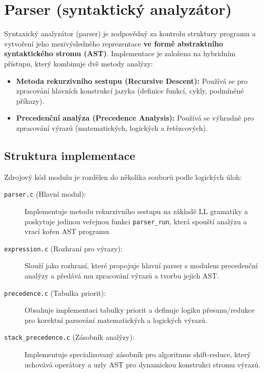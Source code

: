 \section{Parser (syntaktický analyzátor)}

Syntaxický analyzátor (parser) je zodpovědný za kontrolu struktury programu a vytvoření jeho mezivýsledného reprezentace \textbf{ve formě abstraktního syntaktického stromu (AST)}. Implementace je založena na hybridním přístupu, který kombinuje dvě metody analýzy:

\begin{itemize}
    \item \textbf{Metoda rekurzivního sestupu (Recursive Descent):} Používá se pro zpracování hlavních konstrukcí jazyka (definice funkcí, cykly, podmíněné příkazy).
    \item \textbf{Precedenční analýza (Precedence Analysis):} Používá se výhradně pro zpracování výrazů (matematických, logických a řetězcových).
\end{itemize}

\subsection{Struktura implementace}

Zdrojový kód modulu je rozdělen do několika souborů podle logických úloh:

\begin{description}
    \item[\texttt{parser.c} (Hlavní modul):]
    Implementuje metodu rekurzivního sestupu na základě LL gramatiky a poskytuje jedinou veřejnou funkci \texttt{parser\_run}, která spouští analýzu a vrací kořen AST programu.

    \item[\texttt{expression.c} (Rozhraní pro výrazy):]
    Slouží jako rozhraní, které propojuje hlavní parser s modulem precedenční analýzy a předává mu zpracování výrazů a tvorbu jejich AST.

    \item[\texttt{precedence.c} (Tabulka priorit):]
    Obsahuje implementaci tabulky priorit a definuje logiku přesunu/redukce pro korektní parsování matematických a logických výrazů.

    \item[\texttt{stack\_precedence.c} (Zásobník analýzy):]
    Implementuje specializovaný zásobník pro algoritmus shift-reduce, který uchovává operátory a uzly AST pro dynamickou konstrukci stromu výrazů.
\end{description}

